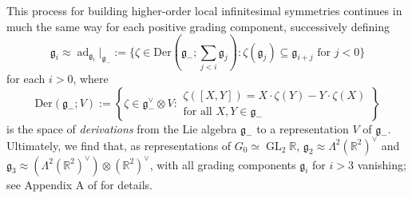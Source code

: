 \documentclass[12pt,a4paper]{amsart}
\theoremstyle{definition}
\DeclareMathOperator{\ad}{ad}
\DeclareMathOperator{\GLin}{GL}
\begin{document}
This process for building higher-order local infinitesimal symmetries continues in much the same way for each positive grading component, successively defining
\[\mathfrak{g}_i\approx\ad_{\mathfrak{g}_i}|_{\mathfrak{g}_-}:=\{\zeta\in\mathrm{Der}(\mathfrak{g}_-;{\textstyle\sum}_{j<i}\mathfrak{g}_j):\zeta(\mathfrak{g}_j)\subseteq\mathfrak{g}_{i+j}\text{ for }j<0\}\]
for each $i>0$, where
\[\mathrm{Der}(\mathfrak{g}_-;V):=\left\{\zeta\in\mathfrak{g}_-^\vee\otimes V:\begin{array}{c}\zeta([X,Y])=X\cdot\zeta(Y)-Y\cdot\zeta(X) \\ \text{for all }X,Y\in\mathfrak{g}_-\end{array}\right\}\]
is the space of \emph{derivations} from the Lie algebra $\mathfrak{g}_-$ to a representation $V$ of $\mathfrak{g}_-$. Ultimately, we find that, as representations of $G_0\simeq\GLin_2\mathbb{R}$, $\mathfrak{g}_2\approx\Lambda^2(\mathbb{R}^2)^\vee$ and $\mathfrak{g}_3\approx(\Lambda^2(\mathbb{R}^2)^\vee)\otimes(\mathbb{R}^2)^\vee$, with all grading components $\mathfrak{g}_i$ for $i>3$ vanishing; see Appendix A of \cite{EricksonThesis} for details. 
\end{document}
